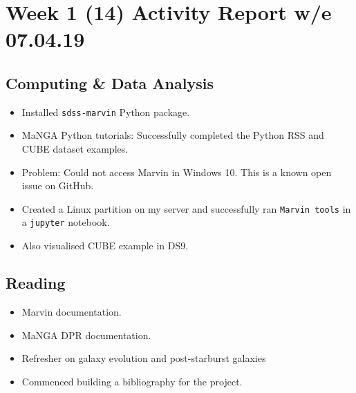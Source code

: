 \section{Week 1 (14) Activity Report w/e 07.04.19}

\subsection{Computing \& Data Analysis}
\begin{itemize}
    \item Installed \texttt{sdss-marvin} Python package.
    \item MaNGA Python tutorials: Successfully completed the Python RSS and CUBE dataset examples.
    \item Problem: Could not access Marvin \citep{brian_cherinka_2018_1146705} in Windows 10. This is a known open issue on GitHub.
    \item Created a Linux partition on my server and successfully ran \texttt{Marvin tools} in a \texttt{jupyter} notebook.
    \item Also visualised CUBE example in DS9.
\end{itemize}
\subsection{Reading}
\begin{itemize}
    \item Marvin documentation.
    \item MaNGA DPR documentation.
    \item Refresher on galaxy evolution and post-starburst galaxies \citep{sparke2007galaxies}
    \item Commenced building a bibliography for the project.
\end{itemize}    
